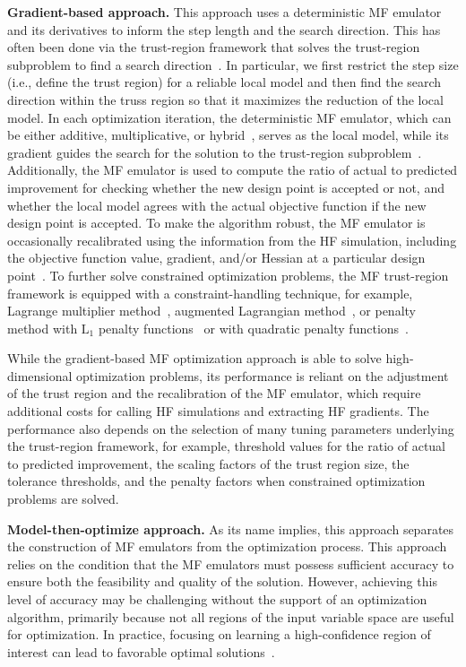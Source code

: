\documentclass[iicol,sn-basic]{sn-jnl}%
\theoremstyle{thmstyleone}%
\theoremstyle{thmstyletwo}
\theoremstyle{thmstylethree}
\begin{document}
\begin{linenumbers}
\textbf{Gradient-based approach.} This approach uses a deterministic MF emulator and its derivatives to inform the step length and the search direction. 
This has often been done via the trust-region framework that solves the trust-region subproblem to find a search direction~\citep{Nocedal2006}.
In particular, we first restrict the step size (i.e., define the trust region) for a reliable local model and then find the search direction within the truss region so that it maximizes the reduction of the local model.
In each optimization iteration, the deterministic MF emulator, which can be either additive, multiplicative, or hybrid~\citep{Gano2005}, serves as the local model, while its gradient guides the search for the solution to the trust-region subproblem~\citep{Alexandrov1998,Alexandrov2001,Robinson2008,March2012a}.
Additionally, the MF emulator is used to compute the ratio of actual to predicted improvement for checking whether the new design point is accepted or not, and whether the local model agrees with the actual objective function if the new design point is accepted.
To make the algorithm robust, the MF emulator is occasionally recalibrated using the information from the HF simulation, including the objective function value, gradient, and/or Hessian at a particular design point~\citep{Alexandrov1998,Alexandrov2001}.
To further solve constrained optimization problems, the MF trust-region framework is equipped with a constraint-handling technique, for example, Lagrange multiplier method~\citep{Robinson2008}, augmented Lagrangian method~\citep{Alexandrov2001}, or penalty method with $\text{L}_1$ penalty functions~\citep{Alexandrov2001,Gano2005} or with quadratic penalty functions~\citep{March2012a,Elham2015}.

While the gradient-based MF optimization approach is able to solve high-dimensional optimization problems, its performance is reliant on the adjustment of the trust region and the recalibration of the MF emulator, which require additional costs for calling HF simulations and extracting HF gradients.
The performance also depends on the selection of many tuning parameters underlying the trust-region framework, for example, threshold values for the ratio of actual to predicted improvement, the scaling factors of the trust region size, the tolerance thresholds, and the penalty factors when constrained optimization problems are solved.
	
\textbf{Model-then-optimize approach.} As its name implies, this approach separates the construction of MF emulators from the optimization process.
This approach relies on the condition that the MF emulators must possess sufficient accuracy to ensure both the feasibility and quality of the solution.
However, achieving this level of accuracy may be challenging without the support of an optimization algorithm, primarily because not all regions of the input variable space are useful for optimization.
In practice, focusing on learning a high-confidence region of interest can lead to favorable optimal solutions~\citep{FZhang2023}.
 

\end{linenumbers}
\end{document}
